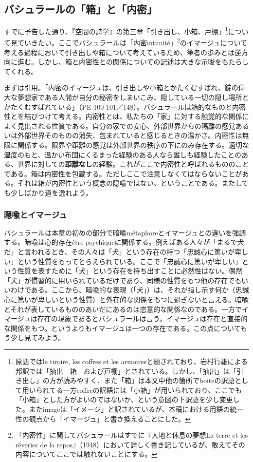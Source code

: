 \documentclass[b5j,twoside,twocolumn]{utarticle}
\begin{document}
\subsection{バシュラールの「箱」と「内密」}
すでに予告した通り、『空間の詩学』の第三章「引き出し、小箱、戸棚」\footnote{原語ではle tiroire, les coffres et les armoiresと題されており、岩村行雄による邦訳では「抽出　箱　および戸棚」とされている。しかし、「抽出」は「引き出し」の方が読みやすく、また「箱」は本文中他の箇所でboiteの訳語として用いられてる一方coffreの訳語には「小箱」が用いられており、ここでも「小箱」とした方がよいのではないか、という意図の下訳語を少し変更した。またimageは「イメージ」と訳されているが、本稿における用語の統一性の観点から「イマージュ」と書き換えることにした。}について見ていきたい。ここでバシュラールは「内密intimité」\footnote{「内密性」に関してバシュラールはすでに『大地と休息の夢想La terre et les rêveries de la repos』（1948）において詳しく書き記しているが、敢えてその内容についてここでは触れないことにする。}のイマージュについて考える過程において引き出しや箱について考えているため、筆者の歩みとは逆方向に進む。しかし、箱と内密性との関係についての記述は大きな示唆をもたらしてくれる。


まずは引用。「内密のイマージュは、引き出しや小箱とかたくむすばれ、錠の偉大な夢想家である人間が自分の秘密をしまいこみ、隠している一切の隠し場所とかたくむすばれている」（PE 100-101／148）。バシュラールは箱的なものと内密性とを結びつけて考える。内密性とは、私たちの「家」に対する触覚的な関係によく見出される性質である。自分の家での安心、外部世界からの隔離の感覚あるいは外部世界そのものの消失、包まれていると感じるときの温かさ。内密性は無限に関係する。限界や距離の感覚は外部世界の秩序の下にのみ存在する。適切な温度のもと、温かい布団にくるまった経験のある人なら誰しも経験したことのある、世界に対しての\textbf{距離なし}の経験。これがここで内密性と呼ばれるもののことである。箱は内密性を包蔵する。ただしここで注意しなくてはならないことがある。それは箱が内密性という概念の隠喩ではない、ということである。またしても少しばかり道を逸れよう。
\subsubsection{隠喩とイマージュ}
バシュラールは本章の初めの部分で暗喩métaphoreとイマージュとの違いを強調する。暗喩は心的存在être psychiqueに関係する。例えばある人々が「まるで犬だ」と言われるとき、その人々は「犬」という存在の持つ「忠誠心に篤いが卑しい」という性質をもってとらえられている。ここで「忠誠心に篤いが卑しい」という性質を表すために「犬」という存在を持ち出すことに必然性はない。偶然「犬」が慣習的に用いられているだけであり、同様の性質をもつ他の存在でもいいわけである。ここから、暗喩的な表現（「犬」）は、それが指し示す何か（忠誠心に篤いが卑しいという性質）と外在的な関係をもつに過ぎないと言える。暗喩とそれが表しているもののあいだにあるのは恣意的な関係なのである。一方でイマージュは存在の現象であるとバシュラールは言う。イマージュは存在と直接的な関係をもつ。というよりもイマージュは一つの存在である。この点についてもう少し見てみよう。
\end{document}
